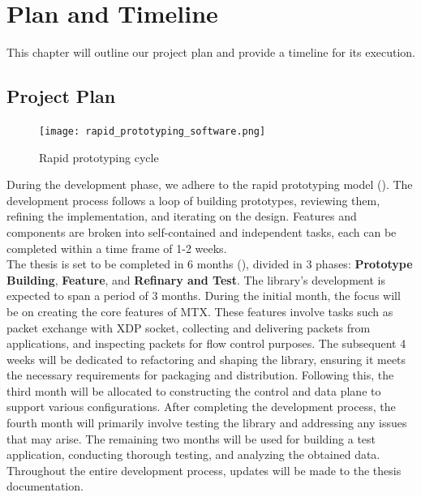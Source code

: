 \chapter{Plan and Timeline}\minitoc\label{sec:plan}\vspace{.5cm}

This chapter will outline our project plan and provide a timeline for its execution.

\section{Project Plan}

\begin{figure}[H]
	\centering
	\texttt{[image: rapid\_prototyping\_software.png]}
	\caption{Rapid prototyping cycle \cite{marketsplash_rapid_2021}}
	\label{fig:plan:rapid_prototyping_software}
\end{figure}

During the development phase, we adhere to the rapid prototyping model (). 
The development process follows a loop of building prototypes, reviewing them, refining the implementation, and iterating on the design. 
Features and components are broken into  self-contained and independent tasks, each can be completed within a time frame of 1-2 weeks.
\\


The thesis is set to be completed in 6 months (), divided in 3 phases: \textbf{Prototype Building}, \textbf{Feature}, and \textbf{Refinary and Test}.
The library's development is expected to span a period of 3 months. 
During the initial month, the focus will be on creating the core features of MTX. 
These features involve tasks such as packet exchange with XDP socket, collecting and delivering packets from applications, and inspecting packets for flow control purposes. 
The subsequent 4 weeks will be dedicated to refactoring and shaping the library, ensuring it meets the necessary requirements for packaging and distribution. 
Following this, the third month will be allocated to constructing the control and data plane to support various configurations. 
After completing the development process, the fourth month will primarily involve testing the library and addressing any issues that may arise. 
The remaining two months will be used for building a test application, conducting thorough testing, and analyzing the obtained data. 
Throughout the entire development process, updates will be made to the thesis documentation.


